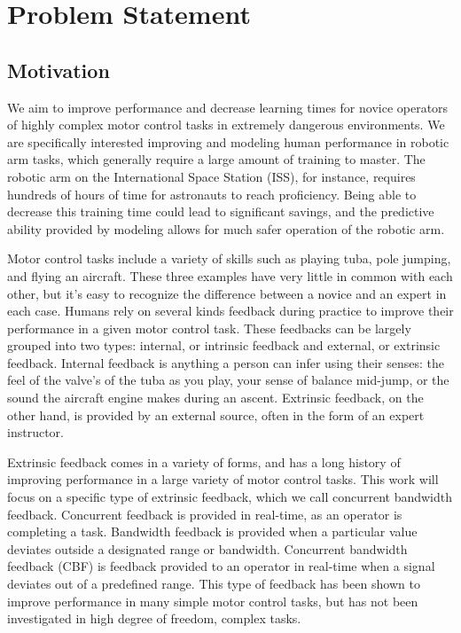 \documentclass[float=false, crop=false]{standalone}
\begin{document}
\section{Problem Statement}
\subsection{Motivation}
We aim to improve performance and decrease learning times for novice operators of highly complex motor control tasks in extremely dangerous environments.
We are specifically interested improving and modeling human performance in robotic arm tasks, which generally require a large amount of training to master.
The robotic arm on the International Space Station (ISS), for instance, requires hundreds of hours of time for astronauts to reach proficiency.
Being able to decrease this training time could lead to significant savings, and the predictive ability provided by modeling allows for much safer operation of the robotic arm.

Motor control tasks include a variety of skills such as playing tuba, pole jumping, and flying an aircraft.
These three examples have very little in common with each other, but it’s easy to recognize the difference between a novice and an expert in each case.
Humans rely on several kinds feedback during practice to improve their performance in a given motor control task.
These feedbacks can be largely grouped into two types: internal, or intrinsic feedback and external, or extrinsic feedback.
Internal feedback is anything a person can infer using their senses: the feel of the valve’s of the tuba as you play, your sense of balance mid-jump, or the sound the aircraft engine makes during an ascent.
Extrinsic feedback, on the other hand, is provided by an external source, often in the form of an expert instructor.

Extrinsic feedback comes in a variety of forms, and has a long history of improving performance in a large variety of motor control tasks.
This work will focus on a specific type of extrinsic feedback, which we call concurrent bandwidth feedback.
Concurrent feedback is provided in real-time, as an operator is completing a task.
Bandwidth feedback is provided when a particular value deviates outside a designated range or bandwidth.
Concurrent bandwidth feedback (CBF) is feedback provided to an operator in real-time when a signal deviates out of a predefined range.
This type of feedback has been shown to improve performance in many simple motor control tasks, but has not been investigated in high degree of freedom, complex tasks.
\end{document}
